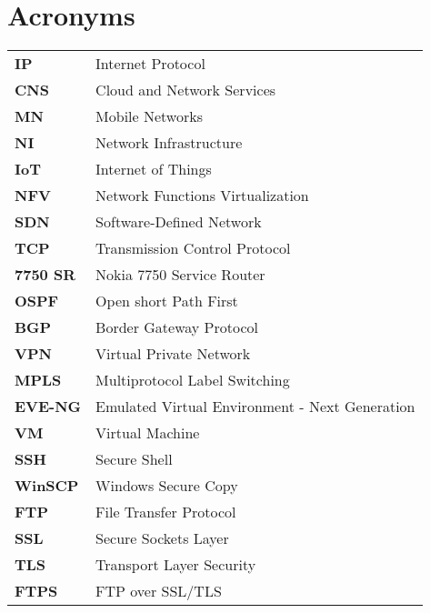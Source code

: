 \chapter{Acronyms}


\begin{tabular}{l l}


\textbf{IP} & Internet Protocol \\
\textbf{CNS} & Cloud and Network Services \\
\textbf{MN} & Mobile Networks \\
\textbf{NI} & Network Infrastructure \\
\textbf{IoT} & Internet of Things \\
\textbf{NFV} & Network Functions Virtualization \\
\textbf{SDN} & Software-Defined Network \\
\textbf{TCP} & Transmission Control Protocol \\
\textbf{7750 SR} & Nokia 7750 Service Router \\
\textbf{OSPF} & Open short Path First \\
\textbf{BGP} & Border Gateway Protocol \\
\textbf{VPN} & Virtual Private Network \\
\textbf{MPLS} & Multiprotocol Label Switching \\
\textbf{EVE-NG} & Emulated Virtual Environment - Next Generation \\
\textbf{VM} & Virtual Machine \\
\textbf{SSH} & Secure Shell \\
\textbf{WinSCP} & Windows Secure Copy \\
\textbf{FTP} & File Transfer Protocol \\
\textbf{SSL} & Secure Sockets Layer \\
\textbf{TLS} & Transport Layer Security \\
\textbf{FTPS} & FTP over SSL/TLS \\



\end{tabular}

\pagebreak

